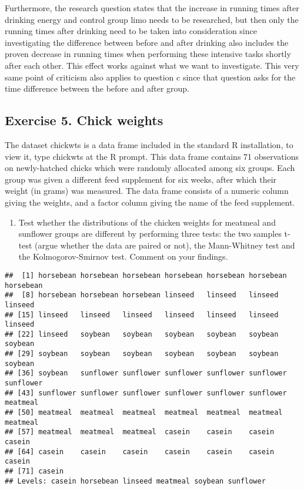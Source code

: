 \documentclass[
]{article}
\newenvironment{Shaded}{\begin{snugshade}}{\end{snugshade}}
\newcommand{\NormalTok}[1]{#1}
\newcommand{\SpecialCharTok}[1]{\textcolor[rgb]{0.00,0.00,0.00}{#1}}
\providecommand{\tightlist}{%
  \setlength{\itemsep}{0pt}\setlength{\parskip}{0pt}}
\begin{document}
Furthermore, the research question states that the increase in running
times after drinking energy and control group limo needs to be
researched, but then only the running times after drinking need to be
taken into consideration since investigating the difference between
before and after drinking also includes the proven decrease in running
times when performing these intensive tasks shortly after each other.
This effect works against what we want to investigate. This very same
point of criticism also applies to question c since that question asks
for the time difference between the before and after group.

\hypertarget{exercise-5.-chick-weights}{%
\subsection{Exercise 5. Chick weights}\label{exercise-5.-chick-weights}}

The dataset chickwts is a data frame included in the standard R
installation, to view it, type chickwts at the R prompt. This data frame
contains 71 observations on newly-hatched chicks which were randomly
allocated among six groups. Each group was given a different feed
supplement for six weeks, after which their weight (in grams) was
measured. The data frame consists of a numeric column giving the
weights, and a factor column giving the name of the feed supplement.

\begin{enumerate}
\def\labelenumi{\alph{enumi})}
\tightlist
\item
  Test whether the distributions of the chicken weights for meatmeal and
  sunflower groups are different by performing three tests: the two
  samples t-test (argue whether the data are paired or not), the
  Mann-Whitney test and the Kolmogorov-Smirnov test. Comment on your
  findings.
\end{enumerate}

\begin{Shaded}
\end{Shaded}

\begin{verbatim}
##  [1] horsebean horsebean horsebean horsebean horsebean horsebean horsebean
##  [8] horsebean horsebean horsebean linseed   linseed   linseed   linseed  
## [15] linseed   linseed   linseed   linseed   linseed   linseed   linseed  
## [22] linseed   soybean   soybean   soybean   soybean   soybean   soybean  
## [29] soybean   soybean   soybean   soybean   soybean   soybean   soybean  
## [36] soybean   sunflower sunflower sunflower sunflower sunflower sunflower
## [43] sunflower sunflower sunflower sunflower sunflower sunflower meatmeal 
## [50] meatmeal  meatmeal  meatmeal  meatmeal  meatmeal  meatmeal  meatmeal 
## [57] meatmeal  meatmeal  meatmeal  casein    casein    casein    casein   
## [64] casein    casein    casein    casein    casein    casein    casein   
## [71] casein   
## Levels: casein horsebean linseed meatmeal soybean sunflower
\end{verbatim}
\end{document}
